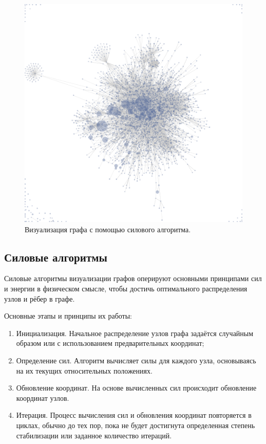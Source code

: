 \documentclass[14pt, russian]{scrartcl}
\begin{document}
\begin{figure}[H]
\centering
  \begin{minipage}[t]{.8\textwidth}
  \centering
\includegraphics[width=.7\textwidth]{./imgs/force-directed-example.png}
  \end{minipage}
\caption{Визуализация графа с помощью силового алгоритма.}
\label{fig:force_directed_example}
\end{figure}

\subsection{Силовые алгоритмы}

Силовые алгоритмы визуализации графов оперируют основными принципами сил и энергии в физическом смысле, чтобы достичь оптимального распределения узлов и рёбер в графе.

Основные этапы и принципы их работы:

\begin{enumerate}
	\item Инициализация. Начальное распределение узлов графа задаётся случайным образом или с использованием предварительных координат;
	\item Определение сил. Алгоритм вычисляет силы для каждого узла, основываясь на их текущих относительных положениях.
	\item Обновление координат. На основе вычисленных сил происходит обновление координат узлов.
	\item Итерация. Процесс вычисления сил и обновления координат повторяется в циклах, обычно до тех пор, пока не будет достигнута определенная степень стабилизации или заданное количество итераций.
\end{enumerate}
\end{document}
